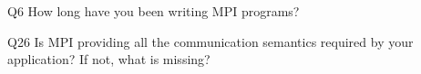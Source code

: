 \begin{description}%
\item{Q6} How long have you been writing MPI programs?%
\item{Q26} Is MPI providing all the communication semantics required by your application? If not, what is missing?%
\end{description}%
